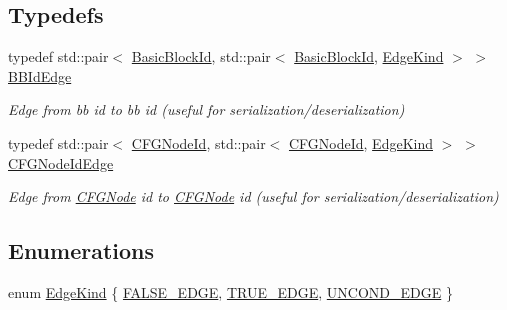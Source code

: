 \subsection*{Typedefs}
\begin{DoxyCompactItemize}
\item 
typedef std\+::pair$<$ \hyperlink{namespacespan_ab988dafbd25ab39838239b91d6a86214}{Basic\+Block\+Id}, std\+::pair$<$ \hyperlink{namespacespan_ab988dafbd25ab39838239b91d6a86214}{Basic\+Block\+Id}, \hyperlink{namespacespan_1_1ir_1_1obj_a3687553dc31f18fb1bd62e0798a3f7f0}{Edge\+Kind} $>$ $>$ \hyperlink{namespacespan_1_1ir_1_1obj_a67ae67fe77ea84d3152bc68919e50c7f}{B\+B\+Id\+Edge}
\begin{DoxyCompactList}\small\item\em Edge from bb id to bb id (useful for serialization/deserialization) \end{DoxyCompactList}\item 
typedef std\+::pair$<$ \hyperlink{namespacespan_a34e8d849ca2007fe03cb1817685d08bf}{C\+F\+G\+Node\+Id}, std\+::pair$<$ \hyperlink{namespacespan_a34e8d849ca2007fe03cb1817685d08bf}{C\+F\+G\+Node\+Id}, \hyperlink{namespacespan_1_1ir_1_1obj_a3687553dc31f18fb1bd62e0798a3f7f0}{Edge\+Kind} $>$ $>$ \hyperlink{namespacespan_1_1ir_1_1obj_a8896662ab566cd79d401c0753d3c4120}{C\+F\+G\+Node\+Id\+Edge}
\begin{DoxyCompactList}\small\item\em Edge from \hyperlink{classspan_1_1ir_1_1obj_1_1CFGNode}{C\+F\+G\+Node} id to \hyperlink{classspan_1_1ir_1_1obj_1_1CFGNode}{C\+F\+G\+Node} id (useful for serialization/deserialization) \end{DoxyCompactList}\end{DoxyCompactItemize}
\subsection*{Enumerations}
\begin{DoxyCompactItemize}
\item 
enum \hyperlink{namespacespan_1_1ir_1_1obj_a3687553dc31f18fb1bd62e0798a3f7f0}{Edge\+Kind} \{ \hyperlink{namespacespan_1_1ir_1_1obj_a3687553dc31f18fb1bd62e0798a3f7f0a1f5ee4019ffe09583948f65d14d7afce}{F\+A\+L\+S\+E\+\_\+\+E\+D\+GE}, 
\hyperlink{namespacespan_1_1ir_1_1obj_a3687553dc31f18fb1bd62e0798a3f7f0a233ed7b2a720909aa5557ba66d0fb25c}{T\+R\+U\+E\+\_\+\+E\+D\+GE}, 
\hyperlink{namespacespan_1_1ir_1_1obj_a3687553dc31f18fb1bd62e0798a3f7f0adc309b8217eea09bb5438dba823068c6}{U\+N\+C\+O\+N\+D\+\_\+\+E\+D\+GE}
 \}
\end{DoxyCompactItemize}


